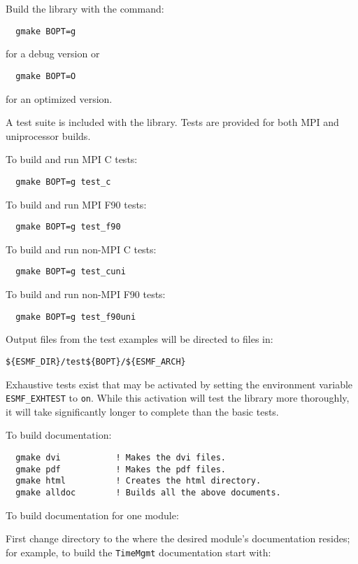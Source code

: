 \smallskip

Build the library with the command:
\begin{verbatim}
  gmake BOPT=g  
\end{verbatim}
  for a debug version or
\begin{verbatim}
  gmake BOPT=O  
\end{verbatim}
  for an optimized version.

A test suite is included with the library.  Tests are provided for both MPI
and uniprocessor builds. 

\noindent To build and run MPI C tests:

\begin{verbatim}
  gmake BOPT=g test_c
\end{verbatim}

\noindent To build and run MPI F90 tests:
\begin{verbatim}
  gmake BOPT=g test_f90
\end{verbatim}

\noindent To build and run non-MPI C tests:
\begin{verbatim}
  gmake BOPT=g test_cuni
\end{verbatim}

\noindent To build and run non-MPI F90 tests:
\begin{verbatim}
  gmake BOPT=g test_f90uni
\end{verbatim}

Output files from the test examples will be directed to files in:
\begin{verbatim}
${ESMF_DIR}/test${BOPT}/${ESMF_ARCH}
\end{verbatim}

Exhaustive tests exist that may be activated by setting the environment variable
{\tt ESMF\_EXHTEST} to {\tt on}.  While this activation will test the library more thoroughly,
it will take significantly longer to complete than the basic tests.

\smallskip

\noindent To build documentation:
\begin{verbatim}
  gmake dvi           ! Makes the dvi files.
  gmake pdf           ! Makes the pdf files.
  gmake html          ! Creates the html directory.
  gmake alldoc        ! Builds all the above documents.
\end{verbatim}

\noindent To build documentation for one module:

\noindent First change directory to the where the desired module's documentation resides;  for
example, to build the {\tt TimeMgmt} documentation start with:

